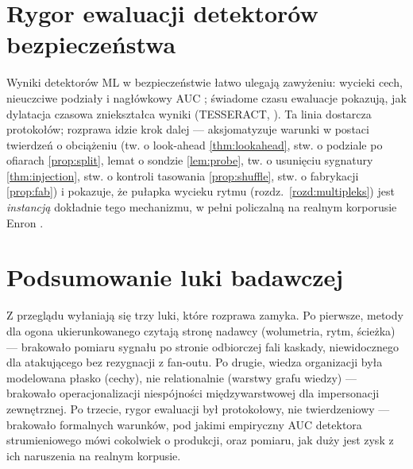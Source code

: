 \section{Rygor ewaluacji detektorów bezpieczeństwa}
\label{sec:p-rygor}

Wyniki detektorów ML w bezpieczeństwie łatwo ulegają zawyżeniu: wycieki cech,
nieuczciwe podziały i nagłówkowy AUC \citep{arp2022dos};
świadome czasu ewaluacje pokazują, jak dylatacja czasowa
zniekształca wyniki (TESSERACT, \citep{pendlebury2019tesseract}).
Ta linia dostarcza protokołów; rozprawa idzie krok dalej ---
aksjomatyzuje warunki w postaci twierdzeń o obciążeniu
(tw. o look-ahead \ref{thm:lookahead}, stw. o podziale po
ofiarach \ref{prop:split}, lemat o sondzie \ref{lem:probe},
tw. o usunięciu sygnatury \ref{thm:injection}, stw. o
kontroli tasowania \ref{prop:shuffle}, stw. o fabrykacji
\ref{prop:fab}) i pokazuje, że pułapka wycieku rytmu
(rozdz.~\ref{rozd:multipleks}) jest \emph{instancją}
dokładnie tego mechanizmu, w pełni policzalną na realnym
korporusie Enron \citep{klimt2004enron}.

\section{Podsumowanie luki badawczej}
\label{sec:p-luka}

Z przeglądu wyłaniają się trzy luki, które rozprawa zamyka.
Po pierwsze, metody dla ogona ukierunkowanego czytają stronę
nadawcy (wolumetria, rytm, ścieżka) --- brakowało pomiaru sygnału
po stronie odbiorczej fali kaskady, niewidocznego dla atakującego
bez rezygnacji z fan-outu. Po drugie, wiedza organizacji
była modelowana płasko (cechy), nie relationalnie (warstwy grafu
wiedzy) --- brakowało operacjonalizacji niespójności międzywarstwowej
dla impersonacji zewnętrznej. Po trzecie, rygor ewaluacji był
protokołowy, nie twierdzeniowy --- brakowało formalnych warunków,
pod jakimi empiryczny AUC detektora strumieniowego mówi cokolwiek
o produkcji, oraz pomiaru, jak duży jest zysk z ich naruszenia
na realnym korpusie.
